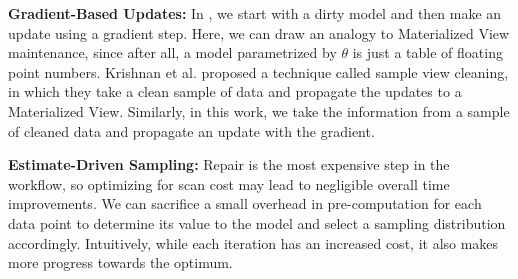 \vspace{0.5em}

\noindent\textbf{Gradient-Based Updates: } In \sys, we start with a dirty model and then make an update using a gradient step. Here, we can draw an analogy to Materialized View maintenance, since after all, a model parametrized by $\theta$ is just a table of floating point numbers.
Krishnan et al. proposed a technique called sample view cleaning, in which they take a clean sample of data and propagate the updates to a Materialized View.
Similarly, in this work, we take the information from a sample of cleaned data and propagate an update with the gradient.

\vspace{0.5em}

\noindent\textbf{Estimate-Driven Sampling: } Repair is the most expensive step in the workflow, so optimizing for scan cost may lead to negligible overall time improvements.
We can sacrifice a small overhead in pre-computation for each data point to determine its value to the model and select a sampling distribution accordingly.
Intuitively, while each iteration has an increased cost, it also makes more progress towards the optimum.
\fi


